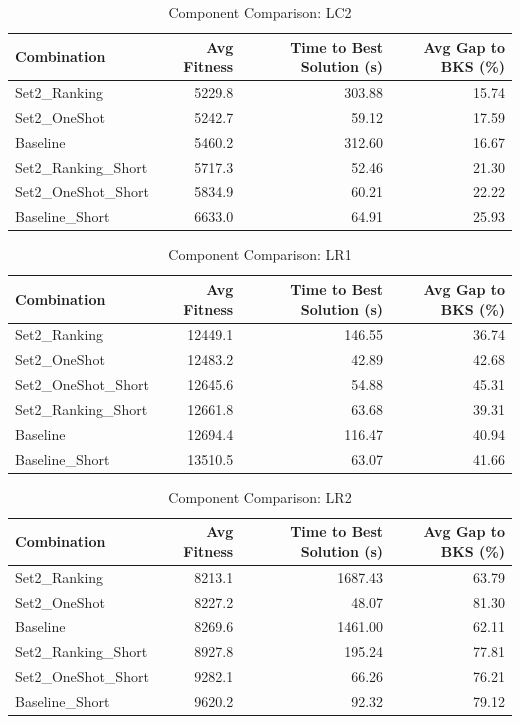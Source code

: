 \documentclass{article}
\begin{document}
\begin{table}[htbp]
\centering
\caption{Component Comparison: LC2}
\label{tab:comparison_lc2}
\begin{tabular}{lrrr}
\toprule
Combination & Avg Fitness & Time to Best Solution (s) & Avg Gap to BKS (\%) \\
\midrule
Set2\_Ranking & 5229.8 & 303.88 & 15.74 \\
Set2\_OneShot & 5242.7 & 59.12 & 17.59 \\
Baseline & 5460.2 & 312.60 & 16.67 \\
Set2\_Ranking\_Short & 5717.3 & 52.46 & 21.30 \\
Set2\_OneShot\_Short & 5834.9 & 60.21 & 22.22 \\
Baseline\_Short & 6633.0 & 64.91 & 25.93 \\
\bottomrule
\end{tabular}
\end{table}

\begin{table}[htbp]
\centering
\caption{Component Comparison: LR1}
\label{tab:comparison_lr1}
\begin{tabular}{lrrr}
\toprule
Combination & Avg Fitness & Time to Best Solution (s) & Avg Gap to BKS (\%) \\
\midrule
Set2\_Ranking & 12449.1 & 146.55 & 36.74 \\
Set2\_OneShot & 12483.2 & 42.89 & 42.68 \\
Set2\_OneShot\_Short & 12645.6 & 54.88 & 45.31 \\
Set2\_Ranking\_Short & 12661.8 & 63.68 & 39.31 \\
Baseline & 12694.4 & 116.47 & 40.94 \\
Baseline\_Short & 13510.5 & 63.07 & 41.66 \\
\bottomrule
\end{tabular}
\end{table}

\begin{table}[htbp]
\centering
\caption{Component Comparison: LR2}
\label{tab:comparison_lr2}
\begin{tabular}{lrrr}
\toprule
Combination & Avg Fitness & Time to Best Solution (s) & Avg Gap to BKS (\%) \\
\midrule
Set2\_Ranking & 8213.1 & 1687.43 & 63.79 \\
Set2\_OneShot & 8227.2 & 48.07 & 81.30 \\
Baseline & 8269.6 & 1461.00 & 62.11 \\
Set2\_Ranking\_Short & 8927.8 & 195.24 & 77.81 \\
Set2\_OneShot\_Short & 9282.1 & 66.26 & 76.21 \\
Baseline\_Short & 9620.2 & 92.32 & 79.12 \\
\bottomrule
\end{tabular}
\end{table}
\end{document}
